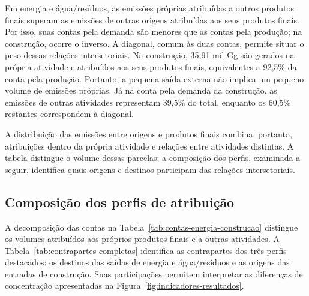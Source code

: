 Em energia e água/resíduos, as emissões próprias atribuídas a outros produtos finais superam as emissões de outras origens atribuídas aos seus produtos finais. Por isso, suas contas pela demanda são menores que as contas pela produção; na construção, ocorre o inverso. A diagonal, comum às duas contas, permite situar o peso dessas relações intersetoriais. Na construção, 35,91 mil Gg são gerados na própria atividade e atribuídos aos seus produtos finais, equivalentes a 92,5\% da conta pela produção. Portanto, a pequena saída externa não implica um pequeno volume de emissões próprias. Já na conta pela demanda da construção, as emissões de outras atividades representam 39,5\% do total, enquanto os 60,5\% restantes correspondem à diagonal.

A distribuição das emissões entre origens e produtos finais combina, portanto, atribuições dentro da própria atividade e relações entre atividades distintas. A tabela distingue o volume dessas parcelas; a composição dos perfis, examinada a seguir, identifica quais origens e destinos participam das relações intersetoriais.





\subsection{Composição dos perfis de atribuição}
\label{sec:composicao-perfis}

A decomposição das contas na Tabela~\ref{tab:contas-energia-construcao} distingue os volumes atribuídos aos próprios produtos finais e a outras atividades. A Tabela~\ref{tab:contrapartes-completas} identifica as contrapartes dos três perfis destacados: os destinos das saídas de energia e água/resíduos e as origens das entradas de construção. Suas participações permitem interpretar as diferenças de concentração apresentadas na Figura~\ref{fig:indicadores-resultados}.

